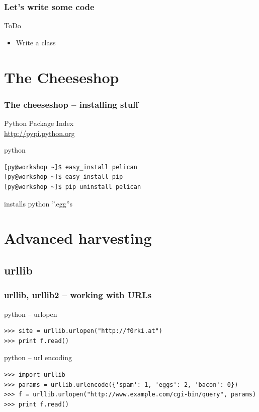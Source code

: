 \documentclass{beamer}
\begin{document}
\begin{frame}
	\frametitle{Let's write some code}
	\begin{block}{ToDo}
	\begin{itemize}
		\item Write a class
		
	\end{itemize}
	\end{block}
\end{frame}

\section{The Cheeseshop}	%

\begin{frame}[fragile]
	\frametitle{The cheeseshop -- installing stuff}
	Python Package Index\\
	\url{http://pypi.python.org}
	\begin{exampleblock}{python}
	\begin{lstlisting}[language=bash]
[py@workshop ~]$ easy_install pelican
[py@workshop ~]$ easy_install pip
[py@workshop ~]$ pip uninstall pelican
	\end{lstlisting}
	\end{exampleblock}
	
	installs python ''.egg''s
\end{frame}

\section{Advanced harvesting}


\subsection*{urllib}	%
\begin{frame}[fragile]
	\frametitle{urllib, urllib2 -- working with URLs}
	\begin{exampleblock}{python -- urlopen}
	\begin{lstlisting}
>>> site = urllib.urlopen("http://f0rki.at")
>>> print f.read()
	\end{lstlisting}
	\end{exampleblock}

\pause

	\begin{exampleblock}{python -- url encoding}
	\begin{lstlisting}
>>> import urllib
>>> params = urllib.urlencode({'spam': 1, 'eggs': 2, 'bacon': 0})
>>> f = urllib.urlopen("http://www.example.com/cgi-bin/query", params)
>>> print f.read()
	\end{lstlisting}
	\end{exampleblock}
\end{frame}
\end{document}

